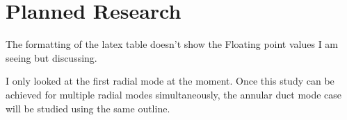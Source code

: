 \documentclass[a4paper]{report}
\begin{document}
\section{Planned Research}
The formatting of the latex table doesn't show the Floating point values I am seeing but
discussing.

I only looked at the first radial mode at the moment. Once this study can be achieved 
for multiple radial modes simultaneously, the annular duct mode case will be studied
using the same outline.

% 
% 




% 

\end{document}
